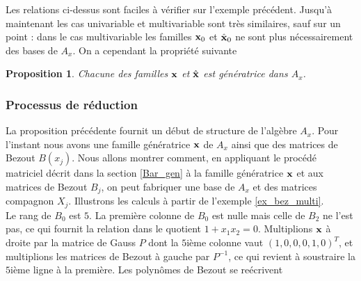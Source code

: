 \documentclass{article}
\theoremstyle{plain}%
\newtheorem{prop}{Proposition}
\theoremstyle{definition}
\theoremstyle{remark}
\begin{document}
Les relations ci-dessus sont faciles à vérifier sur l'exemple précédent. Jusqu'à maintenant les cas univariable et multivariable sont très similaires, sauf sur un point : dans le cas multivariable les familles $\bold{x}_0$ et $\hat{\bold{x}}_0$ ne sont plus nécessairement des bases de $A_x$. On a cependant la propriété suivante

\begin{prop}
Chacune des familles $\bold{x}$ et $\hat{\bold{x}}$ est génératrice dans $A_x$.
\end{prop}





\subsubsection{Processus de réduction}
La proposition précédente fournit un début de structure de l'algèbre $A_x$. Pour l'instant nous avons une famille génératrice $\bold{x}$ de $A_x$ ainsi que des matrices de Bezout $B(x_j)$. 
Nous allons montrer comment, en appliquant le procédé matriciel décrit dans la section \ref{Bar_gen} à la famille génératrice $\bold{x}$ et aux matrices de Bezout $B_j$, on peut fabriquer une base de $A_x$ et des matrices compagnon $X_j$.
Illustrons les calculs à partir de l'exemple \ref{ex_bez_multi}.\\
Le rang de $B_0$ est $5$. La première colonne de $B_0$ est nulle mais celle de $B_2$ ne l'est pas, ce qui fournit la relation dans le quotient $1 + x_1x_2 = 0$.
Multiplions $\bold{x}$ à droite par la matrice de Gauss $P$ dont la $5$ième colonne vaut $(1, 0, 0, 0, 1, 0)^{T}$, et multiplions les matrices de Bezout à gauche par $P^{-1}$, ce qui revient à soustraire la $5$ième ligne à la première.
Les polynômes de Bezout se reécrivent\\
\end{document}
